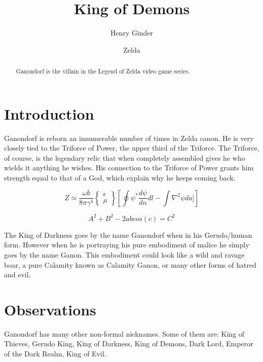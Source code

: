 \documentclass[modern]{aastex63}
\begin{document}
\title{King of Demons}


\author{Henry Ginder}

\author{Zelda}

\begin{abstract}

Ganondorf is the villain in the Legend of Zelda video game series.

\end{abstract}




\section{Introduction}

Ganondorf is reborn an innumerable number of times in Zelda canon. He is very closely tied to the Triforce of Power, the upper third of the Triforce. The Triforce, of course, is the legendary relic that when completely assembled gives he who wields it anything he wishes. His connection to the Triforce of Power grants him strength equal to that of a God, which explain why he keeps coming back. \citep{1997MNRAS.287..591C}


\[
 Z \simeq \frac{\omega k}{8 \pi \gamma^4} 
 \begin{Bmatrix}
\epsilon\\
\mu
\end{Bmatrix} 
\left[\oint \psi^* \frac{d\psi}{dn}dl - \int \nabla^2 \psi da]\right]
\]

\[A^2 + B^2 - 2 a b cos(c)= C^2\]
 \citep{2018SPIE10703E..5OV}
 
The King of Darkness goes by the name Ganondorf when in his Gerudo/human form. However when he is portraying his pure embodiment of malice he simply goes by the name Ganon. This embodiment could look like a wild and ravage boar, a pure Calamity known as Calamity Ganon, or many other forms of hatred and evil.

\section{Observations}

Ganondorf has many other non-formal nicknames. Some of them are: King of Thieves, Gerudo King, King of Darkness, King of Demons, Dark Lord, Emperor of the Dark Realm, King of Evil.
\end{document}
